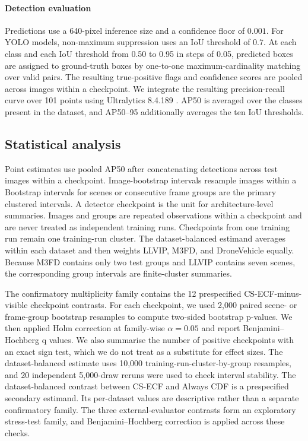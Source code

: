 \documentclass[preprint,11pt]{elsarticle}
\begin{document}
\paragraph{Detection evaluation}
Predictions use a 640-pixel inference size and a confidence floor of \(0.001\).
For YOLO models, non-maximum suppression uses an IoU threshold of \(0.7\). At
each class and each IoU threshold from 0.50 to 0.95 in steps of 0.05, predicted
boxes are assigned to ground-truth boxes by one-to-one maximum-cardinality
matching over valid pairs. The resulting true-positive flags and confidence
scores are pooled across images within a checkpoint. We integrate the resulting
precision-recall curve over 101 points using Ultralytics 8.4.189
\cite{jocher2026ultralytics}. AP50 is averaged over the classes present in the
dataset, and AP50--95 additionally averages the ten IoU thresholds.

\subsection{Statistical analysis}

Point estimates use pooled AP50 after concatenating detections across test
images within a checkpoint. Image-bootstrap intervals resample images within a
Bootstrap intervals for scenes or consecutive frame groups are the primary
clustered intervals. A detector checkpoint is the unit for architecture-level
summaries. Images and groups are
repeated observations within a checkpoint and are never treated as independent
training runs. Checkpoints from one training run remain one training-run
cluster. The dataset-balanced estimand averages within each dataset and then
weights LLVIP, M3FD, and DroneVehicle equally. Because M3FD contains only two
test groups and LLVIP contains seven scenes, the corresponding group intervals
are finite-cluster summaries.

The confirmatory multiplicity family contains the 12 prespecified
CS-ECF-minus-visible checkpoint contrasts. For each checkpoint, we used 2,000
paired scene- or frame-group bootstrap resamples to compute two-sided
bootstrap p-values. We then applied Holm correction at family-wise
\(\alpha=0.05\) and report Benjamini--Hochberg q values. We also summarise the
number of positive checkpoints with an exact sign test, which we do not treat
as a substitute for effect sizes. The dataset-balanced estimate uses 10,000
training-run-cluster-by-group resamples, and 20 independent 5,000-draw reruns
were used to check interval stability. The dataset-balanced contrast between
CS-ECF and Always CDF is a prespecified secondary estimand. Its per-dataset
values are descriptive rather than a separate confirmatory family. The three
external-evaluator contrasts form an exploratory stress-test family, and
Benjamini--Hochberg correction is applied across these checks.
\end{document}
